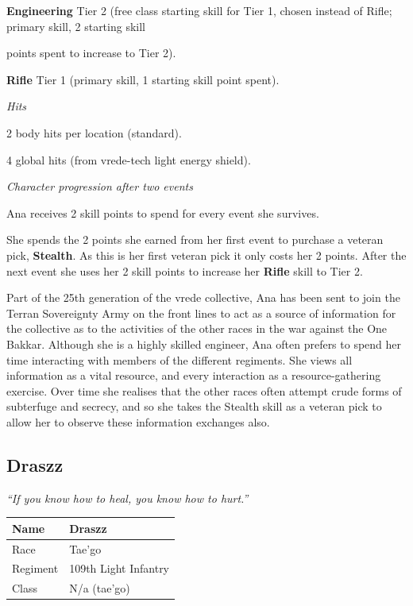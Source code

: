 \textbf{Engineering} Tier 2 (free class starting skill for Tier 1, chosen instead of Rifle; primary skill, 2 starting skill

points spent to increase to Tier 2).

\textbf{Rifle} Tier 1 (primary skill, 1 starting skill point spent).

\textit{Hits}

2 body hits per location (standard).

4 global hits (from vrede-tech light energy shield).

\textit{Character progression after two events}

Ana receives 2 skill points to spend for every event she survives.

She spends the 2 points she earned from her first event to purchase a veteran pick, \textbf{Stealth}. As this is her first veteran pick it only costs her 2 points. After the next event she uses her 2 skill points to increase her \textbf{Rifle} skill to Tier 2.

Part of the 25th generation of the vrede collective, Ana has been sent to join the Terran Sovereignty Army on the front lines to act as a source of information for the collective as to the activities of the other races in the war against the One Bakkar. Although she is a highly skilled engineer, Ana often prefers to spend her time interacting with members of the different regiments. She views all information as a vital resource, and every interaction as a resource-gathering exercise. Over time she realises that the other races often attempt crude forms of subterfuge and secrecy, and so she takes the Stealth skill as a veteran pick to allow her to observe these information exchanges also.

\subsection{Draszz}

\textit{``If you know how to heal, you know how to hurt.''}

\begin{table}
\begin{tabular}{|l|l|} \hline 
Name & Draszz \\
 \hline Race & Tae'go \\
 \hline Regiment & 109th Light Infantry \\
 \hline Class & N/a (tae'go) \\
 \hline \end{tabular}

\end{table}

